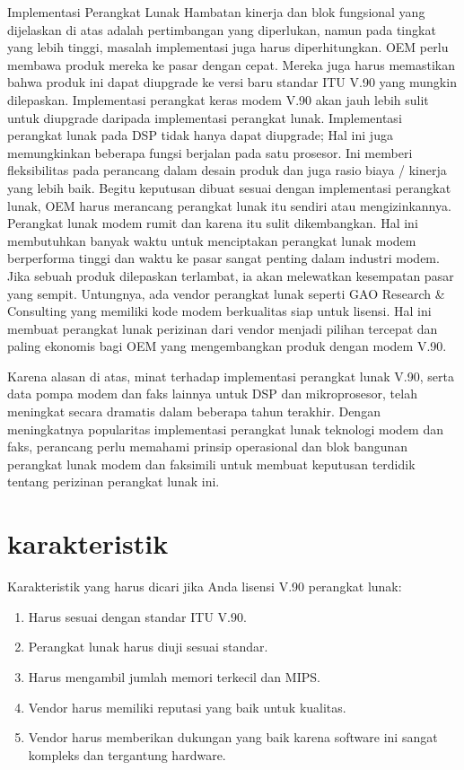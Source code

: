 Implementasi Perangkat Lunak
Hambatan kinerja dan blok fungsional yang dijelaskan di atas adalah pertimbangan yang diperlukan, namun pada tingkat yang lebih tinggi, masalah implementasi juga harus diperhitungkan. OEM perlu membawa produk mereka ke pasar dengan cepat. Mereka juga harus memastikan bahwa produk ini dapat diupgrade ke versi baru standar ITU V.90 yang mungkin dilepaskan. Implementasi perangkat keras modem V.90 akan jauh lebih sulit untuk diupgrade daripada implementasi perangkat lunak. Implementasi perangkat lunak pada DSP tidak hanya dapat diupgrade; Hal ini juga memungkinkan beberapa fungsi berjalan pada satu prosesor. Ini memberi fleksibilitas pada perancang dalam desain produk dan juga rasio biaya / kinerja yang lebih baik. Begitu keputusan dibuat sesuai dengan implementasi perangkat lunak, OEM harus merancang perangkat lunak itu sendiri atau mengizinkannya. Perangkat lunak modem rumit dan karena itu sulit dikembangkan. Hal ini membutuhkan banyak waktu untuk menciptakan perangkat lunak modem berperforma tinggi dan waktu ke pasar sangat penting dalam industri modem. Jika sebuah produk dilepaskan terlambat, ia akan melewatkan kesempatan pasar yang sempit. Untungnya, ada vendor perangkat lunak seperti GAO Research \& Consulting yang memiliki kode modem berkualitas siap untuk lisensi. Hal ini membuat perangkat lunak perizinan dari vendor menjadi pilihan tercepat dan paling ekonomis bagi OEM yang mengembangkan produk dengan modem V.90.

Karena alasan di atas, minat terhadap implementasi perangkat lunak V.90, serta data pompa modem dan faks lainnya untuk DSP dan mikroprosesor, telah meningkat secara dramatis dalam beberapa tahun terakhir. Dengan meningkatnya popularitas implementasi perangkat lunak teknologi modem dan faks, perancang perlu memahami prinsip operasional dan blok bangunan perangkat lunak modem dan faksimili untuk membuat keputusan terdidik tentang perizinan perangkat lunak ini.

\section {karakteristik}
Karakteristik yang harus dicari jika Anda lisensi V.90 perangkat lunak:
\begin{enumerate}
\item Harus sesuai dengan standar ITU V.90.
\item Perangkat lunak harus diuji sesuai standar.
\item Harus mengambil jumlah memori terkecil dan MIPS.
\item Vendor harus memiliki reputasi yang baik untuk kualitas.
\item Vendor harus memberikan dukungan yang baik karena software ini sangat kompleks dan tergantung hardware.
\end{enumerate}
